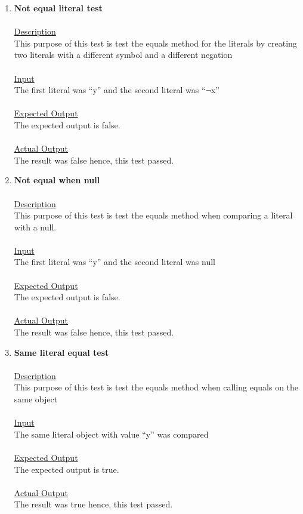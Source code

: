 \documentclass{article}
\newcommand{\quotes}[1]{``#1''}
\begin{document}
\begin{enumerate}
		\item \textbf{Not equal literal test}\\\\
		\underline{Description}\\
		\indent This purpose of this test is test the equals method for the literals by creating two literals with a different symbol and a different negation\\\\
		\underline{Input}\\
		\indent The first literal was \quotes{y} and the second literal was \quotes{$\neg$x}\\	\\
		\underline{Expected Output}\\
		\indent The expected output is false.\\\\
		\underline{Actual Output}\\
		\indent The result was false hence, this test passed.\\
		
		\item \textbf{Not equal when null}\\\\
		\underline{Description}\\
		\indent This purpose of this test is test the equals method when comparing a literal with a null.\\\\
		\underline{Input}\\
		\indent The first literal was \quotes{y} and the second literal was null\\	\\
		\underline{Expected Output}\\
		\indent The expected output is false.\\\\
		\underline{Actual Output}\\
		\indent The result was false hence, this test passed.\\
		
		\item \textbf{Same literal equal test}\\\\
		\underline{Description}\\
		\indent This purpose of this test is test the equals method when calling equals on the same object\\\\
		\underline{Input}\\
		\indent The same literal object with value \quotes{y} was compared\\	\\
		\underline{Expected Output}\\
		\indent The expected output is true.\\\\
		\underline{Actual Output}\\
		\indent The result was true hence, this test passed.\\
	\end{enumerate}
	
\end{document}
